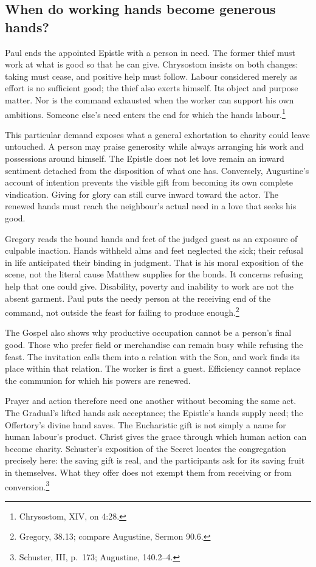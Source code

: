 \subsection{When do working hands become generous hands?}

Paul ends the appointed Epistle with a person in need. The former
thief must work at what is good so that he can give. Chrysostom
insists on both changes: taking must cease, and positive help must
follow. Labour considered merely as effort is no sufficient good;
the thief also exerts himself. Its object and purpose matter.
Nor is the command exhausted when the worker can support his own
ambitions. Someone else's need enters the end for which the hands
labour.\footnote{Chrysostom,  XIV, on 4:28.}

This particular demand exposes what a general exhortation to charity
could leave untouched. A person may praise generosity while always
arranging his work and possessions around himself. The Epistle does
not let love remain an inward sentiment detached from the disposition
of what one has. Conversely, Augustine's account of intention prevents
the visible gift from becoming its own complete vindication. Giving
for glory can still curve inward toward the actor. The renewed hands
must reach the neighbour's actual need in a love that seeks his good.

Gregory reads the bound hands and feet of the judged guest as an
exposure of culpable inaction. Hands withheld alms and feet neglected
the sick; their refusal in life anticipated their binding in judgment.
That is his moral exposition of the scene, not the literal cause
Matthew supplies for the bonds. It concerns refusing help that one
could give. Disability, poverty and inability to work are not the
absent garment. Paul puts the needy person at the receiving end of
the command, not outside the feast for failing to produce enough.\footnote{Gregory,  38.13; compare Augustine,
Sermon 90.6.}

The Gospel also shows why productive occupation cannot be a person's
final good. Those who prefer field or merchandise can remain busy
while refusing the feast. The invitation calls them into a relation
with the Son, and work finds its place within that relation. The
worker is first a guest. Efficiency cannot replace the communion
for which his powers are renewed.

Prayer and action therefore need one another without becoming the
same act. The Gradual's lifted hands ask acceptance; the Epistle's
hands supply need; the Offertory's divine hand saves. The Eucharistic
gift is not simply a name for human labour's product. Christ gives
the grace through which human action can become charity. Schuster's
exposition of the Secret locates the congregation precisely here:
the saving gift is real, and the participants ask for its saving
fruit in themselves. What they offer does not exempt them from
receiving or from conversion.\footnote{Schuster, 
III, p.~173; Augustine,  140.2--4.}

